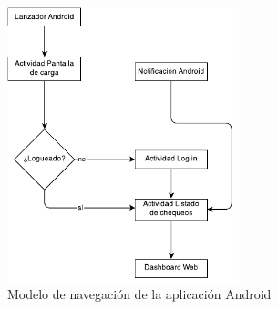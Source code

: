 \begin{figure}[H]
  \centering
  \includegraphics[width=0.6\textwidth]{4_analisis/diagrama_navegacion_android}
  \caption{Modelo de navegación de la aplicación Android}
  \label{fig:modelo-navegacion-android}
\end{figure}





